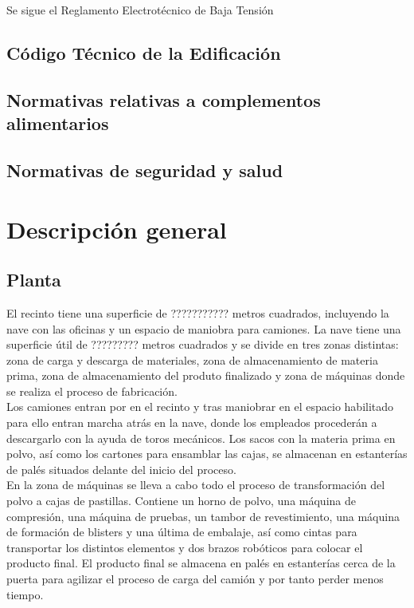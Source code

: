 Se sigue el Reglamento Electrotécnico de Baja Tensión

\subsection{Código Técnico de la Edificación}

\subsection{Normativas relativas a complementos alimentarios}

\subsection{Normativas de seguridad y salud}


\section{Descripción general}
 
\subsection{Planta}
El recinto tiene una superficie de ??????????? metros cuadrados, incluyendo la nave con las oficinas y un espacio de maniobra para camiones.
La nave tiene una superficie útil de ????????? metros cuadrados y se divide en tres zonas distintas: zona de carga y descarga de materiales, zona de almacenamiento de materia prima, zona de almacenamiento del produto finalizado y zona de máquinas donde se realiza el proceso de fabricación.
\\

Los camiones entran por en el recinto y tras maniobrar en el espacio habilitado para ello entran marcha atrás en la nave, donde los empleados procederán a descargarlo con la ayuda de toros mecánicos. Los sacos con la materia prima en polvo, así como los cartones para ensamblar las cajas, se almacenan en estanterías de palés situados delante del inicio del proceso. 
\\

En la zona de máquinas se lleva a cabo todo el proceso de transformación del polvo a cajas de pastillas. Contiene un horno de polvo, una máquina de compresión, una máquina de pruebas, un tambor de revestimiento, una máquina de formación de blisters y una última de embalaje, así como cintas para transportar los distintos elementos y dos brazos robóticos para colocar el producto final. El producto final se almacena en palés en estanterías cerca de la puerta para agilizar el proceso de carga del camión y por tanto perder menos tiempo.
\\

